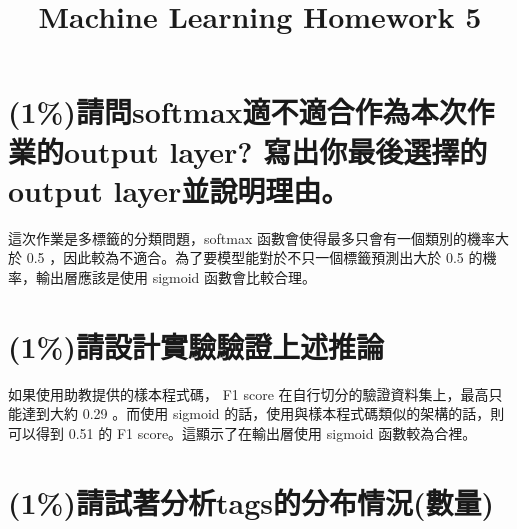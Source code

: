 \documentclass[fleqn,a4paper,12pt]{article}
\title{Machine Learning Homework 5}
\date{}
\begin{document}
\thispagestyle{fancy}

\section{(1\%)請問softmax適不適合作為本次作業的output layer? 寫出你最後選擇的output layer並說明理由。}

這次作業是多標籤的分類問題，softmax 函數會使得最多只會有一個類別的機率大於 0.5 ，因此較為不適合。為了要模型能對於不只一個標籤預測出大於 0.5 的機率，輸出層應該是使用 sigmoid 函數會比較合理。

\section{(1\%)請設計實驗驗證上述推論}

如果使用助教提供的樣本程式碼， F1 score 在自行切分的驗證資料集上，最高只能達到大約 0.29 。而使用 sigmoid 的話，使用與樣本程式碼類似的架構的話，則可以得到 0.51 的 F1 score。這顯示了在輸出層使用 sigmoid 函數較為合裡。

\section{(1\%)請試著分析tags的分布情況(數量)}
\end{document}
